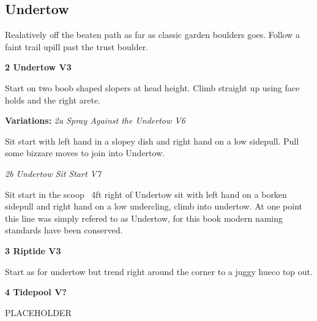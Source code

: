 \begin{multicols*}{2}
			\subsection*{Undertow}\label{bf:Undertow}
			\begin{minipage}{\columnwidth}
			Realatively off the beaten path as far as classic garden boulders goes. Follow a faint trail upill past the trust boulder.
			\end{minipage}
			
\label{pt:Riptide}

					\label{rt:Undertow}\colorbox{green!20}{\textbf{2 Undertow V3 \ding{72}    }}
					\begin{adjustwidth}{0.5cm}{}
					\begin{minipage}{\linewidth}					
					Start on two boob shaped slopers at head height. Climb straight up using face holds and the right arete.
					\end{minipage}
						\newline \textbf{Variations:} \newline
							\label{vr:Spray Against the Undertow}\colorbox{RoyalBlue!20}{\emph{2a Spray Against the Undertow V6  }}
							\begin{adjustwidth}{0.5cm}{}
							\begin{minipage}{\linewidth}					
							Sit start with left hand in a slopey dish and right hand on a low sidepull. Pull some bizzare moves to join into Undertow.
							\end{minipage}
							\end{adjustwidth}
							\label{vr:Undertow Sit Start}\colorbox{Goldenrod!50}{\emph{2b Undertow Sit Start V7  \ding{72}   }}
							\begin{adjustwidth}{0.5cm}{}
							\begin{minipage}{\linewidth}					
							Sit start in the scoop ~4ft right of Undertow sit with left hand on a borken sidepull and right hand on a low undercling, climb into undertow. At one point this line was simply refered to as Undertow, for this book modern naming standards have been conserved.
							\end{minipage}
							\end{adjustwidth}
					\end{adjustwidth}
					\label{rt:Riptide}\colorbox{green!20}{\textbf{3 Riptide V3    }}
					\begin{adjustwidth}{0.5cm}{}
					\begin{minipage}{\linewidth}					
					Start as for undertow but trend right around the corner to a juggy hueco top out.
					\end{minipage}
					\end{adjustwidth}
					\label{rt:Tidepool}\colorbox{black!20}{\textbf{4 Tidepool V?  }}
					\begin{adjustwidth}{0.5cm}{}
					\begin{minipage}{\linewidth}					
					PLACEHOLDER
					\end{minipage}
					\end{adjustwidth}

\end{multicols*}
